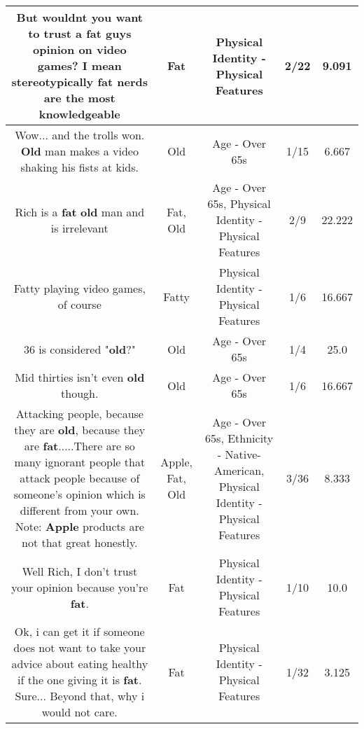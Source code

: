 \documentclass[11pt]{article}
\newlength\mylength
\begin{document}
\begin{center}
\begin{longtable}{|C{.65\mylength}|C{.30\mylength}|C{.12\mylength}|C{.12\mylength}|C{.12\mylength}|}
  \small But wouldnt you want to trust a \textbf{fat} guys opinion on video games? I mean stereotypically \textbf{fat} nerds are the most knowledgeable\normalsize   & Fat & Physical Identity - Physical Features & 2/22 & 9.091 \\  \hline
  \small Wow... and the trolls won. \textbf{Old} man makes a video shaking his fists at kids.\normalsize   & Old & Age - Over 65s & 1/15 & 6.667 \\  \hline
  \small Rich is a \textbf{fat} \textbf{old} man and is irrelevant\normalsize   & Fat, Old & Age - Over 65s, Physical Identity - Physical Features & 2/9 & 22.222 \\  \hline
  \small Fatty playing video games, of course\normalsize   & Fatty & Physical Identity - Physical Features & 1/6 & 16.667 \\  \hline
  \small 36 is considered "\textbf{old}?"\normalsize   & Old & Age - Over 65s & 1/4 & 25.0 \\  \hline
  \small Mid thirties isn't even \textbf{old} though.\normalsize   & Old & Age - Over 65s & 1/6 & 16.667 \\  \hline
  \small Attacking people, because they are \textbf{old}, because they are \textbf{fat}.....There are so many ignorant people that attack people because of someone's opinion which is different from your own. Note: \textbf{Apple} products are not that great honestly.\normalsize   & Apple, Fat, Old & Age - Over 65s, Ethnicity - Native-American, Physical Identity - Physical Features & 3/36 & 8.333 \\  \hline
  \small Well Rich, I don't trust your opinion because you're \textbf{fat}.\normalsize   & Fat & Physical Identity - Physical Features & 1/10 & 10.0 \\  \hline
  \small Ok, i can get it if someone does not want to take your advice about eating healthy if the one giving it is \textbf{fat}. Sure... Beyond that, why i would not care.\normalsize   & Fat & Physical Identity - Physical Features & 1/32 & 3.125 \\  \hline

\end{longtable}
\end{center}
\end{document}

